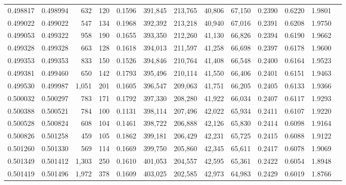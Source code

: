\begin{tabular}{rrrrrrrrrrrrr}
0.498817 & 0.498994 &   632 &   120 &                                     0.1596 & 391,845 & 213,765 &  40,806 &  67,150 & 0.2390 & 0.6220 & 1.9801 \\
0.499022 & 0.499022 &   547 &   134 &                                     0.1968 & 392,392 & 213,218 &  40,940 &  67,016 & 0.2391 & 0.6208 & 1.9750 \\
0.499053 & 0.499322 &   958 &   190 &                                     0.1655 & 393,350 & 212,260 &  41,130 &  66,826 & 0.2394 & 0.6190 & 1.9662 \\
0.499328 & 0.499328 &   663 &   128 &                                     0.1618 & 394,013 & 211,597 &  41,258 &  66,698 & 0.2397 & 0.6178 & 1.9600 \\
0.499353 & 0.499353 &   833 &   150 &                                     0.1526 & 394,846 & 210,764 &  41,408 &  66,548 & 0.2400 & 0.6164 & 1.9523 \\
0.499381 & 0.499460 &   650 &   142 &                                     0.1793 & 395,496 & 210,114 &  41,550 &  66,406 & 0.2401 & 0.6151 & 1.9463 \\
0.499530 & 0.499987 & 1,051 &   201 &                                     0.1605 & 396,547 & 209,063 &  41,751 &  66,205 & 0.2405 & 0.6133 & 1.9366 \\
0.500032 & 0.500297 &   783 &   171 &                                     0.1792 & 397,330 & 208,280 &  41,922 &  66,034 & 0.2407 & 0.6117 & 1.9293 \\
0.500388 & 0.500521 &   784 &   100 &                                     0.1131 & 398,114 & 207,496 &  42,022 &  65,934 & 0.2411 & 0.6107 & 1.9220 \\
0.500528 & 0.500824 &   608 &   104 &                                     0.1461 & 398,722 & 206,888 &  42,126 &  65,830 & 0.2414 & 0.6098 & 1.9164 \\
0.500826 & 0.501258 &   459 &   105 &                                     0.1862 & 399,181 & 206,429 &  42,231 &  65,725 & 0.2415 & 0.6088 & 1.9122 \\
0.501260 & 0.501330 &   569 &   114 &                                     0.1669 & 399,750 & 205,860 &  42,345 &  65,611 & 0.2417 & 0.6078 & 1.9069 \\
0.501349 & 0.501412 & 1,303 &   250 &                                     0.1610 & 401,053 & 204,557 &  42,595 &  65,361 & 0.2422 & 0.6054 & 1.8948 \\
0.501419 & 0.501496 & 1,972 &   378 &                                     0.1609 & 403,025 & 202,585 &  42,973 &  64,983 & 0.2429 & 0.6019 & 1.8766 \\

\end{tabular}
